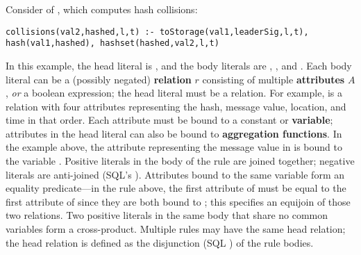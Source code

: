 Consider  of , which computes hash collisions:
\begin{lstlisting}[language=Dedalus, float=false, firstnumber=3]
collisions(val2,hashed,l,t) :- toStorage(val1,leaderSig,l,t), hash(val1,hashed), hashset(hashed,val2,l,t)
\end{lstlisting}
In this example, the head literal is , and the body literals are , , and .
Each body literal can be a (possibly negated) \textbf{relation} $r$ consisting of multiple \textbf{attributes} $A$, \emph{or}
a boolean expression; the head literal must be a relation. For example,  is a relation with four attributes representing the hash, message value, 
location, and time in that order.
Each attribute must be bound to a constant or \textbf{variable}; attributes in the head literal can also be bound to \textbf{aggregation functions}.
In the example above, the attribute representing the message value in  is bound to the variable .
Positive literals in the body of the rule are joined together; negative literals are anti-joined (SQL's ). 
Attributes bound to the same variable form an equality predicate---in the rule above, the first attribute of  must be equal to the first attribute of  since they are both bound to ; this specifies an equijoin of those two relations. 
Two positive literals in the same body that share no common variables form a cross-product.
Multiple rules may have the same head relation; the head relation is defined as the disjunction (SQL ) of the rule bodies.

